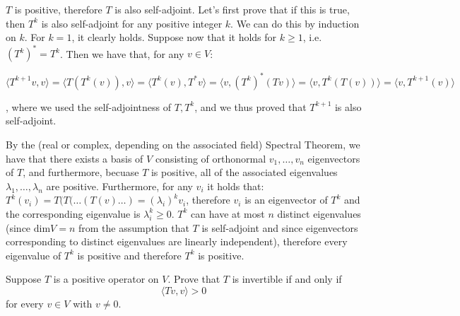 \begin{solution}

    $T$ is positive, therefore $T$ is also self-adjoint. Let's first prove that if this is true, then $T^k$ is also self-adjoint for any positive integer $k$. We can do this by induction on $k$. For $k = 1$, it clearly holds. Suppose now that it holds for $k \geq 1$, i.e.\ $(T^k)^* = T^k$. Then we have that, for any $v \in V$:
    
    $$ \langle T^{k+1}v, v \rangle = \langle T(T^k(v)), v \rangle = \langle T^k(v), T^*v \rangle = \langle v, (T^k)^*(Tv) \rangle = \langle v, T^k(T(v)) \rangle = \langle v, T^{k+1}(v) \rangle$$

    , where we used the self-adjointness of $T, T^k$, and we thus proved that $T^{k+1}$ is also self-adjoint.

    By the (real or complex, depending on the associated field) Spectral Theorem, we have that there exists a basis of $V$ consisting of orthonormal $v_1, \ldots, v_n$ eigenvectors of $T$, and furthermore, becuase $T$ is positive, all of the associated eigenvalues $\lambda_1, \ldots, \lambda_n$ are positive. Furthermore, for any $v_i$ it holds that: $T^k(v_i) = T(T(\ldots(T(v)\ldots) = (\lambda_i)^kv_i$, therefore $v_i$ is an eigenvector of $T^k$ and the corresponding eigenvalue is $\lambda_i^k \geq 0$. $T^k$ can have at most $n$ distinct eigenvalues (since $\text{dim} V = n$ from the assumption that $T$ is self-adjoint and since eigenvectors corresponding to distinct eigenvalues are linearly independent), therefore every eigenvalue of $T^k$ is positive and therefore $T^k$ is positive.
\end{solution}

\begin{exercise}{7}
    Suppose $T$ is a positive operator on $V$. Prove that $T$ is invertible if and only if
    $$\langle Tv, v \rangle > 0$$
    for every $v \in V$ with $v \neq 0$.
\end{exercise}


